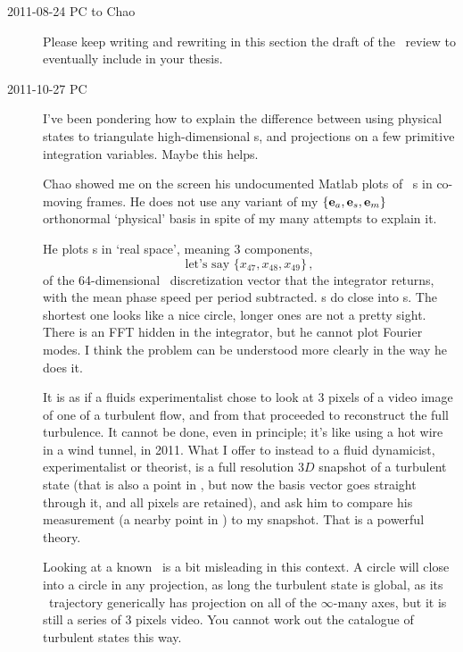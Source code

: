 \begin{description}

\item[2011-08-24 PC to Chao]
Please keep writing and rewriting in this section the draft of the
\KSe\ review to eventually include in your thesis.


\item[2011-10-27 PC]                                            \toCB
I've been pondering how to explain the
difference between using physical states to triangulate high-dimensional
\statesp s, and projections on a few primitive integration variables.
Maybe this helps.

\medskip

Chao showed me on the screen
his undocumented Matlab plots of \KS\ \rpo s in co-moving frames. He does
not use any variant of my $\{{\bf e}_a, {\bf e}_s, {\bf e}_m\}$ orthonormal
`physical' basis  in spite of my many attempts to
explain it.

\medskip

He plots \rpo s in `real space', meaning 3 components,
\[
\mbox{let's say } \{x_{47}, x_{48}, x_{49}\}
\,,
\]
of the 64-dimensional \KS\ discretization
vector that the integrator returns, with the mean phase speed per period
subtracted. \Rpo s do close into \po s. The shortest one looks like a
nice circle, longer ones are not a pretty sight. There is an FFT hidden in the integrator, but he
cannot plot Fourier modes. I think the problem can be understood
more clearly in the way he does it.

\medskip

It is as if a fluids experimentalist chose to look at 3 pixels of a video
image of one of a turbulent flow, and from that proceeded to reconstruct
the full turbulence. It cannot be done, even in principle; it's like
using a hot wire in a wind tunnel, in 2011. What I offer to instead to a
fluid dynamicist, experimentalist or theorist, is a full resolution $3D$
snapshot of a turbulent state (that is also a point in \statesp, but now
the basis vector goes straight through  it, and all pixels are retained),
and ask him to compare his measurement (a nearby point in \statesp) to my
snapshot. That is a powerful theory.

\medskip

Looking at a known \rpo\ is a bit misleading in this context. A circle
will close into a circle in any projection, as long the turbulent state
is global, as its \statesp\ trajectory generically has projection on all
of the $\infty$-many axes, but it is still a series of 3 pixels video.
You cannot work out the catalogue of turbulent states this way.


\end{description}

